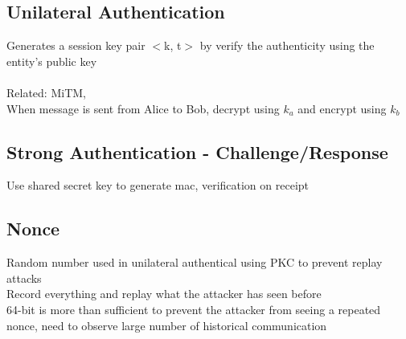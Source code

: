 \documentclass[11pt]{article}
\begin{document}
\begin{multicols*}{3}
\subsection*{Unilateral Authentication}
Generates a session key pair $<$k, t$>$ by verify the authenticity using the entity's public key\\\\
Related: MiTM,\\
When message is sent from Alice to Bob, decrypt using $k_{a}$ and encrypt using $k_{b}$\\
\subsection*{Strong Authentication - Challenge/Response}
Use shared secret key to generate mac, verification on receipt
\subsection*{Nonce}
Random number used in unilateral authentical using PKC to prevent replay attacks\\
Record everything and replay what the attacker has seen before\\
64-bit is more than sufficient to prevent the attacker from seeing a repeated nonce, need to observe large number of historical communication

\end{multicols*}
\end{document}
